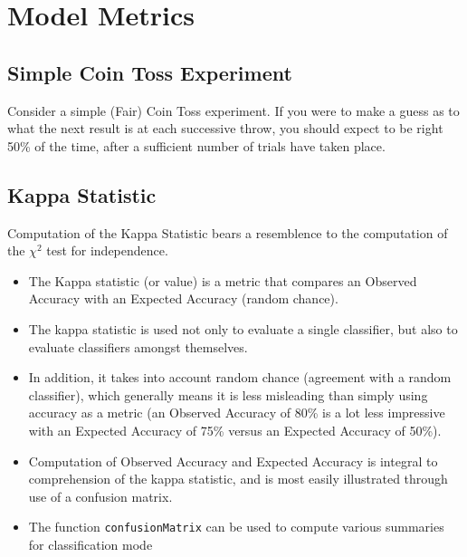 \documentclass[caret-main.tex]{subfiles}
\begin{document}
\section{Model Metrics}


\subsection{Simple Coin Toss Experiment}

Consider a simple (Fair) Coin Toss experiment. If you were to make a guess as to what the next result is  at each successive throw, you should expect to be right 50\% of the time, after a sufficient number of trials have taken place.

\subsection{Kappa Statistic}

Computation of the Kappa Statistic bears a resemblence to the computation of the $\chi^2$ test for independence.
\begin{itemize}
\item The Kappa statistic (or value) is a metric that compares an Observed Accuracy with an Expected Accuracy (random chance).\item The kappa statistic is used not only to evaluate a single classifier, but also to evaluate classifiers amongst themselves. \item In addition, it takes into account random chance (agreement with a random classifier), which generally means it is less misleading than simply using accuracy as a metric (an Observed Accuracy of 80\% is a lot less impressive with an Expected Accuracy of 75\% versus an Expected Accuracy of 50\%). \item Computation of Observed Accuracy and Expected Accuracy is integral to comprehension of the kappa statistic, and is most easily illustrated through use of a confusion matrix.
\item 
The function \texttt{confusionMatrix} can be used to compute various summaries for classification
mode
\end{itemize}
\end{document}
